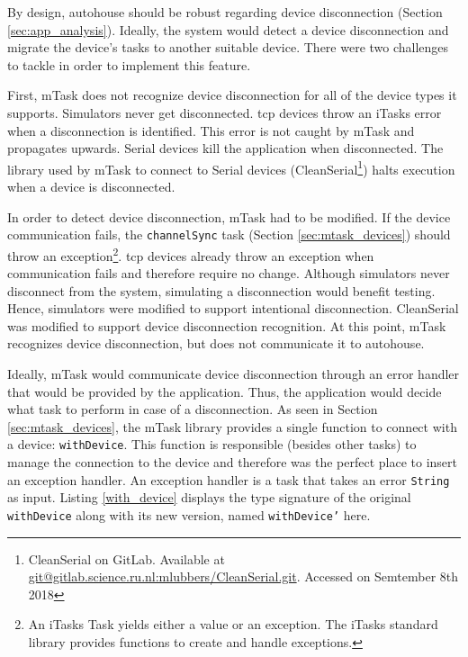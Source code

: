 By design, \gls{autohouse} should be robust regarding device disconnection (Section \ref{sec:app_analysis}). Ideally, the system would detect a device disconnection and migrate the device's tasks to another suitable device. There were two challenges to tackle in order to implement this feature. 

First, \gls{mTask} does not recognize device disconnection for all of the device types it supports. Simulators never get disconnected. \acs{tcp} devices throw an \gls{iTasks} error when a disconnection is identified. This error is not caught by mTask and propagates upwards. Serial devices kill the application when disconnected. The library used by \gls{mTask} to connect to Serial devices (CleanSerial\footnote{CleanSerial on GitLab. Available at \url{git@gitlab.science.ru.nl:mlubbers/CleanSerial.git}. Accessed on Semtember 8th 2018}) halts execution when a device is disconnected. 

In order to detect device disconnection, \gls{mTask} had to be modified. If the device communication fails, the \texttt{channelSync} task (Section \ref{sec:mtask_devices}) should throw an exception\footnote{An \gls{iTasks} Task yields either a value or an exception. The \gls{iTasks} standard library provides functions to create and handle exceptions.}. \acs{tcp} devices already throw an exception when communication fails and therefore require no change. Although simulators never disconnect from the system, simulating a disconnection would benefit testing. Hence, simulators were modified to support intentional disconnection. CleanSerial was modified to support device disconnection recognition. At this point, \gls{mTask} recognizes device disconnection, but does not communicate it to \gls{autohouse}. 

Ideally, \gls{mTask} would communicate device disconnection through an error handler that would be provided by the application. Thus, the application would decide what task to perform in case of a disconnection. As seen in Section \ref{sec:mtask_devices}, the \gls{mTask} library provides a single function to connect with a device: \texttt{withDevice}. This function is responsible (besides other tasks) to manage the connection to the device and therefore was the perfect place to insert an exception handler. An exception handler is a task that takes an error \texttt{String} as input. Listing \ref{with_device} displays the type signature of the original \texttt{withDevice} along with its new version, named \texttt{withDevice'} here. 

